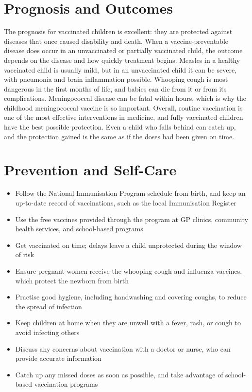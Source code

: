 \section*{Prognosis and Outcomes}
The prognosis for vaccinated children is excellent: they are protected against diseases that once caused disability and death. When a vaccine-preventable disease does occur in an unvaccinated or partially vaccinated child, the outcome depends on the disease and how quickly treatment begins. Measles in a healthy vaccinated child is usually mild, but in an unvaccinated child it can be severe, with pneumonia and brain inflammation possible. Whooping cough is most dangerous in the first months of life, and babies can die from it or from its complications. Meningococcal disease can be fatal within hours, which is why the childhood meningococcal vaccine is so important. Overall, routine vaccination is one of the most effective interventions in medicine, and fully vaccinated children have the best possible protection. Even a child who falls behind can catch up, and the protection gained is the same as if the doses had been given on time.

\section*{Prevention and Self-Care}
\begin{itemize}
    \item Follow the National Immunisation Program schedule from birth, and keep an up-to-date record of vaccinations, such as the local Immunisation Register
    \item Use the free vaccines provided through the program at GP clinics, community health services, and school-based programs
    \item Get vaccinated on time; delays leave a child unprotected during the window of risk
    \item Ensure pregnant women receive the whooping cough and influenza vaccines, which protect the newborn from birth
    \item Practise good hygiene, including handwashing and covering coughs, to reduce the spread of infection
    \item Keep children at home when they are unwell with a fever, rash, or cough to avoid infecting others
    \item Discuss any concerns about vaccination with a doctor or nurse, who can provide accurate information
    \item Catch up any missed doses as soon as possible, and take advantage of school-based vaccination programs
\end{itemize}

